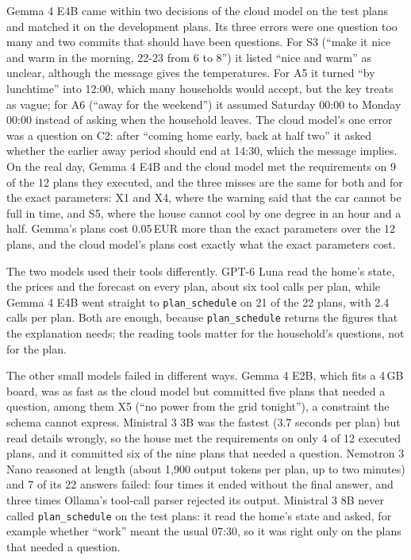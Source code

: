 Gemma 4 E4B came within two decisions of the cloud model on the test
plans and matched it on the development plans. Its three errors were
one question too many and two commits that should have been questions.
For S3 (``make it nice and warm in the morning, 22-23 from 6 to 8'') it
listed ``nice and warm'' as unclear, although the message gives the
temperatures. For A5 it turned ``by lunchtime'' into 12:00, which many
households would accept, but the key treats as vague; for A6 (``away for
the weekend'') it assumed Saturday 00:00 to Monday 00:00 instead of
asking when the household leaves. The cloud model's one error was a
question on C2: after ``coming home early, back at half two'' it asked
whether the earlier away period should end at 14:30, which the message
implies. On the real day, Gemma 4 E4B and the cloud model met the
requirements on 9 of the 12 plans they executed, and the three misses
are the same for both and for the exact parameters: X1 and X4, where
the warning said that the car cannot be full in time, and S5, where the
house cannot cool by one degree in an hour and a half. Gemma's plans
cost 0.05\,EUR more than the exact parameters over the 12 plans, and
the cloud model's plans cost exactly what the exact parameters cost.

The two models used their tools differently. GPT-6 Luna read the home's
state, the prices and the forecast on every plan, about six tool calls
per plan, while Gemma 4 E4B went straight to \texttt{plan\_schedule} on
21 of the 22 plans, with 2.4 calls per plan. Both are enough, because
\texttt{plan\_schedule} returns the figures that the explanation needs;
the reading tools matter for the household's questions, not for the
plan.

The other small models failed in different ways. Gemma 4 E2B, which fits
a 4\,GB board, was as fast as the cloud model but committed five plans
that needed a question, among them X5 (``no power from the grid
tonight''), a constraint the schema cannot express. Ministral 3 3B was
the fastest (3.7 seconds per plan) but read details wrongly, so the
house met the requirements on only 4 of 12 executed plans, and it
committed six of the nine plans that needed a question. Nemotron 3 Nano
reasoned at length (about 1,900 output tokens per plan, up to two
minutes) and 7 of its 22 answers failed: four times it ended without
the final answer, and three times Ollama's tool-call parser rejected its
output. Ministral 3 8B never called
\texttt{plan\_schedule} on the test plans: it read the home's state and
asked, for example whether ``work'' meant the usual 07:30, so it was
right only on the plans that needed a question.

